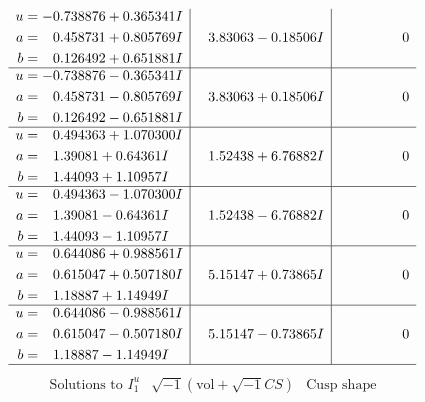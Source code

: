 \documentclass[1p]{elsarticle_modified}
\theoremstyle{definition}
\newcommand{\I}{\sqrt{-1}}
\begin{document}
$$\begin{array}{c|c|c}
\begin{aligned}
u &= -0.738876 + 0.365341 I \\
a &= \phantom{-}0.458731 + 0.805769 I \\
b &= \phantom{-}0.126492 + 0.651881 I\end{aligned}
 & \phantom{-}3.83063 - 0.18506 I & \phantom{-0.000000 } 0 \\ \hline\begin{aligned}
u &= -0.738876 - 0.365341 I \\
a &= \phantom{-}0.458731 - 0.805769 I \\
b &= \phantom{-}0.126492 - 0.651881 I\end{aligned}
 & \phantom{-}3.83063 + 0.18506 I & \phantom{-0.000000 } 0 \\ \hline\begin{aligned}
u &= \phantom{-}0.494363 + 1.070300 I \\
a &= \phantom{-}1.39081 + 0.64361 I \\
b &= \phantom{-}1.44093 + 1.10957 I\end{aligned}
 & \phantom{-}1.52438 + 6.76882 I & \phantom{-0.000000 } 0 \\ \hline\begin{aligned}
u &= \phantom{-}0.494363 - 1.070300 I \\
a &= \phantom{-}1.39081 - 0.64361 I \\
b &= \phantom{-}1.44093 - 1.10957 I\end{aligned}
 & \phantom{-}1.52438 - 6.76882 I & \phantom{-0.000000 } 0 \\ \hline\begin{aligned}
u &= \phantom{-}0.644086 + 0.988561 I \\
a &= \phantom{-}0.615047 + 0.507180 I \\
b &= \phantom{-}1.18887 + 1.14949 I\end{aligned}
 & \phantom{-}5.15147 + 0.73865 I & \phantom{-0.000000 } 0 \\ \hline\begin{aligned}
u &= \phantom{-}0.644086 - 0.988561 I \\
a &= \phantom{-}0.615047 - 0.507180 I \\
b &= \phantom{-}1.18887 - 1.14949 I\end{aligned}
 & \phantom{-}5.15147 - 0.73865 I & \phantom{-0.000000 } 0\\
 \hline 
 \end{array}$$\newpage$$\begin{array}{c|c|c}  
\text{Solutions to }I^u_{1}& \I (\text{vol} + \sqrt{-1}CS) & \text{Cusp shape}\\

\end{array}$$
\end{document}
